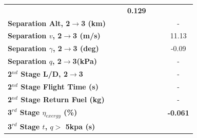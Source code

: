 \begin{table}[ht]
\begin{tabular}{l c c c c c c}
		& \textbf{\secondExergyEffIspOneHundredFive}
		& \textbf{\secondExergyEffIspOneHundredTen}
		& \textbf{0.129}
		\\
		\textbf{Separation Alt, 2$\rightarrow$3 (km)}
		& \secondthirdSeparationAltIspNinety
		& \secondthirdSeparationAltIspNinetyFive
		& \secondthirdSeparationAltIspStandard
		& \secondthirdSeparationAltIspOneHundredFive
		& \secondthirdSeparationAltIspOneHundredTen
		& -
		\\
		\textbf{Separation $v$, 2$\rightarrow$3 (m/s)}
		& \secondthirdSeparationvIspNinety
		& \secondthirdSeparationvIspNinetyFive
		& \secondthirdSeparationvIspStandard
		& \secondthirdSeparationvIspOneHundredFive
		& \secondthirdSeparationvIspOneHundredTen
		&11.13
		\\
		\textbf{Separation $\gamma$, 2$\rightarrow$3 (deg)}
		& \secondthirdSeparationgammaIspNinety
		& \secondthirdSeparationgammaIspNinetyFive
		& \secondthirdSeparationgammaIspStandard
		& \secondthirdSeparationgammaIspOneHundredFive
		& \secondthirdSeparationgammaIspOneHundredTen
		&-0.09
		\\
		\textbf{Separation $q$, 2$\rightarrow$3(kPa)}
		& \secondthirdSeparationqIspNinety
		& \secondthirdSeparationqIspNinetyFive
		& \secondthirdSeparationqIspStandard
		& \secondthirdSeparationqIspOneHundredFive
		& \secondthirdSeparationqIspOneHundredTen
		& -
		\\
		\textbf{2$^{nd}$ Stage L/D, 2$\rightarrow$3}
		& \secondthirdSeparationLDIspNinety
		& \secondthirdSeparationLDIspNinetyFive
		& \secondthirdSeparationLDIspStandard
		& \secondthirdSeparationLDIspOneHundredFive
		& \secondthirdSeparationLDIspOneHundredTen
		& -
		\\
		\textbf{2$^{nd}$ Stage Flight Time (s)}
		& \secondFlightTimeIspNinety
		& \secondFlightTimeIspNinetyFive
		& \secondFlightTimeIspStandard
		& \secondFlightTimeIspOneHundredFive
		& \secondFlightTimeIspOneHundredTen
		& -
		\\
		\textbf{2$^{nd}$ Stage Return Fuel (kg)}
		& \returnFuelIspNinety
		& \returnFuelIspNinetyFive
		& \returnFuelIspStandard
		& \returnFuelIspOneHundredFive
		& \returnFuelIspOneHundredTen
		& -
		\\
		\hline 
		\textbf{3$^{rd}$ Stage $\eta_{exergy}$ (\%)}
		& \textbf{\thirddExergyEffIspNinety}
		& \textbf{\thirddExergyEffIspNinetyFive}
		& \textbf{\thirddExergyEffIspStandard}
		& \textbf{\thirddExergyEffIspOneHundredFive}
		& \textbf{\thirddExergyEffIspOneHundredTen}
		& \textbf{-0.061}
		\\
		\textbf{3$^{rd}$ Stage $t$, $q >$ 5kpa (s)}

\end{tabular}
\end{table}
